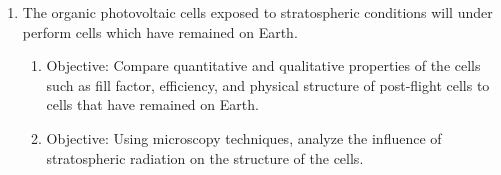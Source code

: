 \begin{enumerate}
\item The organic photovoltaic cells exposed to stratospheric conditions will under perform cells which have remained on Earth.
  \begin{enumerate}
  \item Objective: Compare quantitative and qualitative properties of the cells such as fill factor, efficiency, and physical structure of post-flight cells to cells that have remained on Earth.
  \item Objective: Using microscopy techniques, analyze the influence of stratospheric radiation on the structure of the cells.
  \end{enumerate}
\end{enumerate}
  
\vspace*{-0.5cm}
